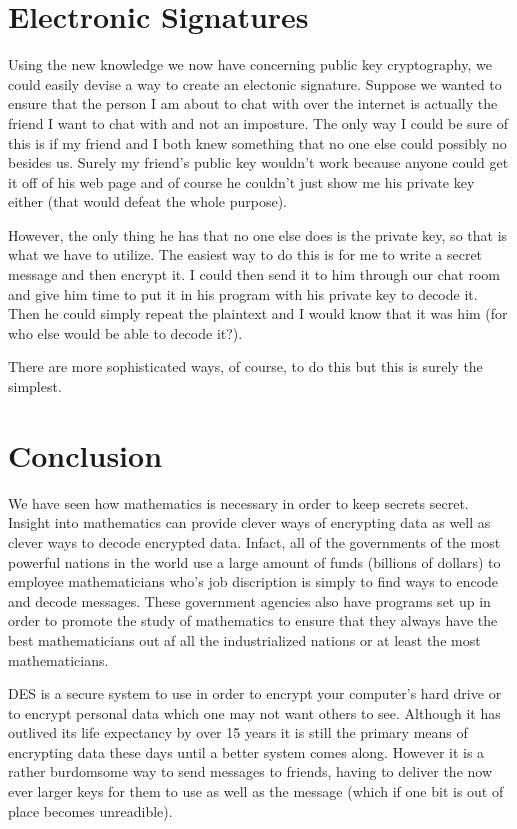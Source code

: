\documentclass[12pt]{report}
\begin{document}
\section*{Electronic Signatures}

Using the new knowledge we now have concerning public key cryptography, we could easily devise a way to create an electonic signature.  Suppose we wanted to ensure that the person I am about to chat with over the internet is actually the friend I want to chat with and not an imposture.  The only way I could be sure of this is if my friend and I both knew something that no one else could possibly no besides us.  Surely my friend's public key wouldn't work because anyone could get it off of his web page and of course he couldn't just show me his private key either (that would defeat the whole purpose).

However, the only thing he has that no one else does is the private key, so that is what we have to utilize.  The easiest way to do this is for me to write a secret message and then encrypt it.  I could then send it to him through our chat room and give him time to put it in his program with his private key to decode it.  Then he could simply repeat the plaintext and I would know that it was him (for who else would be able to decode it?).  

There are more sophisticated ways, of course, to do this but this is surely the simplest.
  
\section*{Conclusion}
We have seen how mathematics is necessary in order to keep secrets secret.  Insight into mathematics can provide clever ways of encrypting data as well as clever ways to decode encrypted data.  Infact, all of the governments of the most powerful nations in the world use a large amount of funds (billions of dollars) to employee mathematicians who's job discription is simply to find ways to encode and decode messages.  These government agencies also have programs set up in order to promote the study of mathematics to ensure that they always have the best mathematicians out af all the industrialized nations or at least the most mathematicians.

DES is a secure system to use in order to encrypt your computer's hard drive or to encrypt personal data which one may not want others to see.  Although it has outlived its life expectancy by over 15 years it is still the primary means of encrypting data these days until a better system comes along.  However it is a rather burdomsome way to send messages to friends, having to deliver the now ever larger keys for them to use as well as the message (which if one bit is out of place becomes unreadible).
\end{document}

